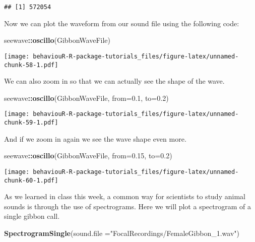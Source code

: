 \documentclass[]{book}
\newenvironment{Shaded}{\begin{snugshade}}{\end{snugshade}}
\newcommand{\DataTypeTok}[1]{\textcolor[rgb]{0.13,0.29,0.53}{#1}}
\newcommand{\FloatTok}[1]{\textcolor[rgb]{0.00,0.00,0.81}{#1}}
\newcommand{\KeywordTok}[1]{\textcolor[rgb]{0.13,0.29,0.53}{\textbf{#1}}}
\newcommand{\NormalTok}[1]{#1}
\newcommand{\OperatorTok}[1]{\textcolor[rgb]{0.81,0.36,0.00}{\textbf{#1}}}
\newcommand{\StringTok}[1]{\textcolor[rgb]{0.31,0.60,0.02}{#1}}
\begin{document}
\begin{verbatim}
## [1] 572054
\end{verbatim}

Now we can plot the waveform from our sound file using the following code:

\begin{Shaded}
\begin{Highlighting}[]
\NormalTok{seewave}\OperatorTok{::}\KeywordTok{oscillo}\NormalTok{(GibbonWaveFile)}
\end{Highlighting}
\end{Shaded}

\texttt{[image: behaviouR-R-package-tutorials\_files/figure-latex/unnamed-chunk-58-1.pdf]}

We can also zoom in so that we can actually see the shape of the wave.

\begin{Shaded}
\begin{Highlighting}[]
\NormalTok{seewave}\OperatorTok{::}\KeywordTok{oscillo}\NormalTok{(GibbonWaveFile, }\DataTypeTok{from=}\FloatTok{0.1}\NormalTok{, }\DataTypeTok{to=}\FloatTok{0.2}\NormalTok{)}
\end{Highlighting}
\end{Shaded}

\texttt{[image: behaviouR-R-package-tutorials\_files/figure-latex/unnamed-chunk-59-1.pdf]}

And if we zoom in again we see the wave shape even more.

\begin{Shaded}
\begin{Highlighting}[]
\NormalTok{seewave}\OperatorTok{::}\KeywordTok{oscillo}\NormalTok{(GibbonWaveFile, }\DataTypeTok{from=}\FloatTok{0.15}\NormalTok{, }\DataTypeTok{to=}\FloatTok{0.2}\NormalTok{)}
\end{Highlighting}
\end{Shaded}

\texttt{[image: behaviouR-R-package-tutorials\_files/figure-latex/unnamed-chunk-60-1.pdf]}

As we learned in class this week, a common way for scientists to study animal sounds is through the use of spectrograms. Here we will plot a spectrogram of a single gibbon call.

\begin{Shaded}
\begin{Highlighting}[]
\KeywordTok{SpectrogramSingle}\NormalTok{(}\DataTypeTok{sound.file =}\StringTok{"FocalRecordings/FemaleGibbon_1.wav"}\NormalTok{)}
\end{Highlighting}
\end{Shaded}
\end{document}
